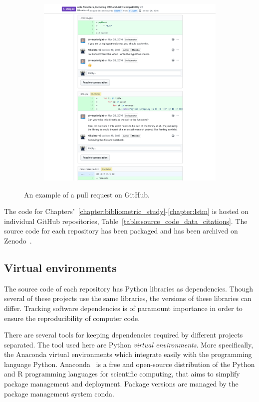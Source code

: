 \begin{figure}[!htbp]
\begin{subfigure}{0.495\textwidth}
    \includegraphics[width=\textwidth]{src/chapters/01/img/GitHub_discussion_two}
\end{subfigure}
\caption{An example of a pull request on GitHub.}\label{fig:pull_request_github}
\end{figure}

The code for Chapters'~\ref{chapter:bibliometric_study}-\ref{chapter:lstm} is
hosted on individual GitHub repositories,
Table~\ref{table:source_code_data_citations}. The source code for each
repository has been packaged and has been archived on Zenodo~\cite{zenodo}.  %

\subsection{Virtual environments}

The source code of each repository has Python libraries as dependencies. Though
several of these projects use the same libraries, the versions of these
libraries can differ. Tracking software dependencies is of paramount importance
in order to ensure the reproducibility of computer code.

There are several tools for keeping dependencies required by different projects
separated. The tool used here are Python \textit{virtual environments}. More
specifically, the Anaconda virtual environments which integrate easily with the
programming language Python. Anaconda~\cite{anaconda} is a free and open-source distribution of
the Python and R programming languages for scientific computing, that aims to
simplify package management and deployment. Package versions are managed by the
package management system conda.

